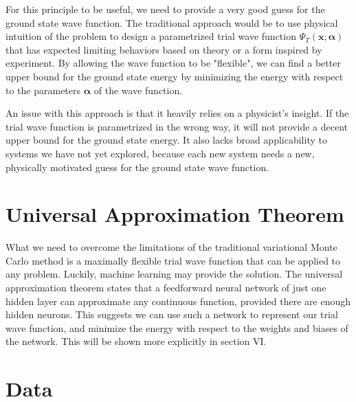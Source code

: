 \documentclass[prb,aps,twocolumn,showpacs,10pt]{revtex4-1}
\begin{document}
For this principle to be useful, we need to provide a very good guess for the ground state wave function. The traditional approach would be to use physical intuition of the problem to design a parametrized trial wave function $\Psi_T(\bm{x}; \bm{\alpha})$ that has expected limiting behaviors based on theory or a form inspired by experiment. By allowing the wave function to be "flexible", we can find a better upper bound for the ground state energy by minimizing the energy with respect to the parameters $\bm{\alpha}$ of the wave function. 

An issue with this approach is that it heavily relies on a physicist's insight. If the trial wave function is parametrized in the wrong way, it will not provide a decent upper bound for the ground state energy. It also lacks broad applicability to systems we have not yet explored, because each new system needs a new, physically motivated guess for the ground state wave function.


\section{Universal Approximation Theorem}

What we need to overcome the limitations of the traditional variational Monte Carlo method is a maximally flexible trial wave function that can be applied to any problem. Luckily, machine learning may provide the solution. The universal approximation theorem states that a feedforward neural network of just one hidden layer can approximate any continuous function, provided there are enough hidden neurons. This suggests we can use such a network to represent our trial wave function, and minimize the energy with respect to the weights and biases of the network. This will be shown more explicitly in section VI. 


\section{Data}
\end{document}
